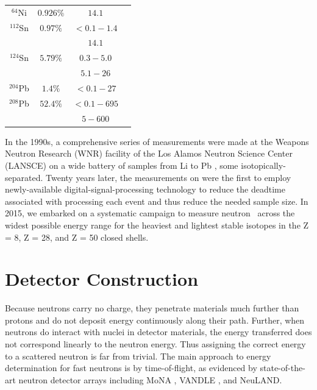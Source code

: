 \begin{table}[ht]
\begin{center}
\begin{tabular}{ c c c c }
            $^{64}$Ni & $0.926\%$ & $14.1$ & \cite{Dukarevich1967}\\

            $^{112}$Sn & $0.97\%$ & $<0.1-1.4$ & \cite{Timokhov1989}\\
            & & $14.1$ & \cite{Dukarevich1967}\\

            $^{124}$Sn & $5.79\%$ & $0.3-5.0$ & \cite{Harper1982}\\
            & & $5.1-26$ & \cite{Rapaport1980}\\

            $^{204}$Pb & $1.4\%$ & $<0.1-27$ & \cite{Carlton2003}\\

            $^{208}$Pb & $52.4\%$ & $<0.1 - 695$ & \cite{Harvey1999}\\
            & & $5-600$ & \cite{Finlay1993}\\

            \hline
        \end{tabular}
    \end{center}
\end{table}

In the 1990s, a comprehensive series of measurements were made at the Weapons Neutron Research (WNR)
facility of the Los Alamos Neutron Science Center (LANSCE) on a wide battery of samples from Li to
Pb \cite{Finlay1993, Abfalterer2001}, some isotopically-separated. Twenty years
later, the measurements on \caAughtEight \cite{Shane2010} were the first 
to employ newly-available digital-signal-processing technology to reduce the deadtime associated
with processing each event and thus reduce the needed sample size. In 2015, we
embarked on a systematic campaign to measure neutron \tot\ across the widest possible energy range
for the heaviest and lightest stable isotopes in the Z = 8, Z = 28, and Z = 50 closed shells.

\section{Detector Construction}
Because neutrons carry no charge, they penetrate materials much further than protons and do not
deposit energy continuously along their path. Further, when neutrons do interact with nuclei in
detector materials, the energy transferred does not correspond linearly to the neutron energy. Thus
assigning the correct energy to a scattered neutron is far from trivial. The main approach to
energy determination for fast neutrons is by time-of-flight, as evidenced by state-of-the-art
neutron detector arrays including MoNA \cite{MoNA}, VANDLE \cite{VANDLE}, and
NeuLAND\cite{NeuLAND}.

